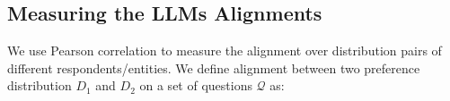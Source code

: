 \subsection{Measuring the LLMs Alignments} \label{sec:stage2}
We use Pearson correlation
to measure the alignment over distribution pairs of different respondents/entities. We define alignment between two preference distribution $D_1$ and $D_2$ on a set of questions $\mathcal{Q}$ as:


